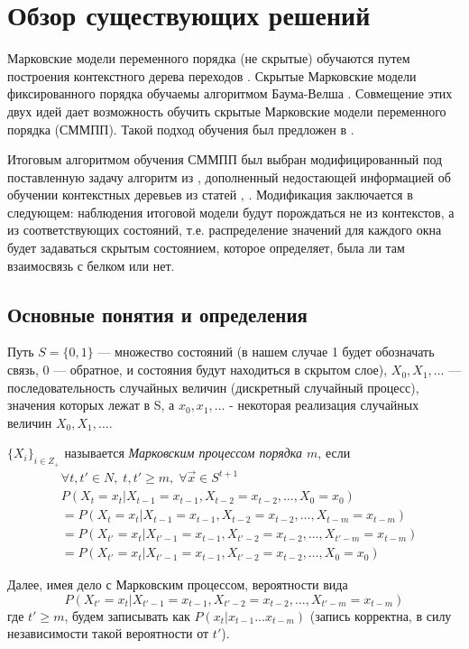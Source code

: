 \documentclass{matmex-diploma-custom}
\begin{document}
\section{Обзор существующих решений}
Марковские модели переменного порядка (не скрытые) обучаются путем построения контекстного дерева переходов \cite{Buhlmann1999}. Скрытые Марковские модели фиксированного порядка обучаемы алгоритмом Баума-Велша \cite{Rabiner1989}.
Совмещение этих двух идей дает возможность обучить скрытые Марковские модели переменного порядка (СММПП). Такой подход обучения был предложен в \cite{Wang2006}. 

Итоговым алгоритмом обучения СММПП был выбран модифицированный под поставленную задачу алгоритм  из \cite{Wang2006}, дополненный недостающей информацией об обучении контекстных деревьев из статей \cite{Buhlmann1999}, \cite{Dumont2014}.
Модификация заключается в следующем: наблюдения итоговой модели будут порождаться не из контекстов, а из соответствующих состояний, т.е. распределение значений для каждого окна будет задаваться скрытым состоянием, которое определяет, была ли там взаимосвязь с белком или нет. 

\subsection{Основные понятия и определения}

Путь 
$ S = \{0, 1\} $ --- множество состояний (в нашем случае 1 будет обозначать связь, 0 --- обратное, и состояния будут находиться в скрытом слое), 
$X_0, X_1, \ldots $ --- последовательность случайных величин (дискретный случайный процесс), значения которых лежат в S, а
$x_0, x_1, \ldots$ - некоторая реализация случайных величин $X_0, X_1, \ldots $.

\begin{definition} $ \{X_{i}\}_{i \in Z_{+}}$ называется \emph{Марковским процессом порядка $ m $}, если  
\begin{align*}
&\forall t, t'\in N, \;t, t' \geq m,\; \forall \overrightarrow{x} \in S^{t+1}
\\&P(X_{t} = x_{t}|X_{t-1}=x_{t-1},X_{t-2}=x_{t-2}, \ldots ,X_{0}=x_{0}) 
\\&=P(X_{t} = x_{t}|X_{t-1}=x_{t-1},X_{t-2}=x_{t-2}, \ldots ,X_{t-m}=x_{t-m})
\\&=P(X_{t'} = x_{t}|X_{t'-1}=x_{t-1},X_{t'-2}=x_{t-2}, \ldots ,X_{t'-m}=x_{t-m})
\\&=P(X_{t'} = x_{t}|X_{t'-1}=x_{t-1},X_{t'-2}=x_{t-2}, \ldots ,X_{0}=x_{0}) 
\end{align*}
\label{MP}
\end{definition}
Далее, имея дело с Марковским процессом, вероятности вида  
$$P(X_{t'} = x_{t}|X_{t'-1}=x_{t-1},X_{t'-2}=x_{t-2}, \ldots ,X_{t'-m}=x_{t-m})$$ где $t'\geq m$, будем записывать как $P(x_{t} |x_{t-1}\ldots x_{t-m})$ (запись корректна, в силу независимости такой вероятности от $t'$).
\end{document}
